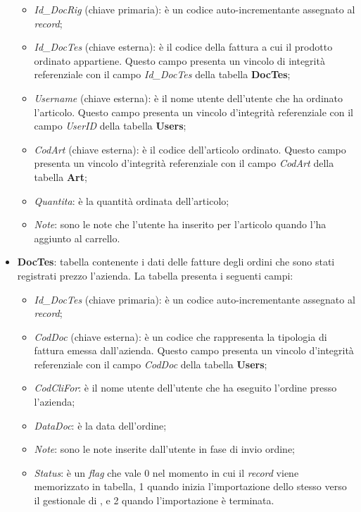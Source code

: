 \begin{itemize}
		\begin{itemize}
			\item \textit{Id\_DocRig} (chiave primaria): è un codice auto-incrementante assegnato al \textit{record}; 
			\item \textit{Id\_DocTes} (chiave esterna): è il codice della fattura a cui il prodotto ordinato appartiene. Questo campo presenta un vincolo di integrità referenziale con il campo \textit{Id\_DocTes} della tabella \textbf{DocTes};
			\item \textit{Username} (chiave esterna): è il nome utente dell'utente che ha ordinato l'articolo. Questo campo presenta un vincolo d'integrità referenziale con il campo \textit{UserID} della tabella \textbf{Users};
			\item \textit{CodArt} (chiave esterna): è il codice dell'articolo ordinato. Questo campo presenta un vincolo d'integrità referenziale con il campo \textit{CodArt} della tabella \textbf{Art};
			\item \textit{Quantita}: è la quantità ordinata dell'articolo;
			\item \textit{Note}: sono le note che l'utente ha inserito per l'articolo quando l'ha aggiunto al carrello.
		\end{itemize}
	\item \textbf{DocTes}: tabella contenente i dati delle fatture degli ordini che sono stati registrati prezzo l'azienda. La tabella presenta i seguenti campi:
		\begin{itemize}
			\item \textit{Id\_DocTes} (chiave primaria): è un codice auto-incrementante assegnato al \textit{record};
			\item \textit{CodDoc} (chiave esterna): è un codice che rappresenta la tipologia di fattura emessa dall'azienda. Questo campo presenta un vincolo d'integrità referenziale con il campo \textit{CodDoc} della tabella \textbf{Users};
			\item \textit{CodCliFor}: è il nome utente dell'utente che ha eseguito l'ordine presso l'azienda;
			\item \textit{DataDoc}: è la data dell'ordine;
			\item \textit{Note}: sono le note inserite dall'utente in fase di invio ordine;
			\item \textit{Status}: è un \textit{flag} che vale 0 nel momento in cui il \textit{record} viene memorizzato in tabella, 1 quando inizia l'importazione dello stesso verso il gestionale di \visione{}, e 2 quando l'importazione è terminata.

\end{itemize}
\end{itemize}
